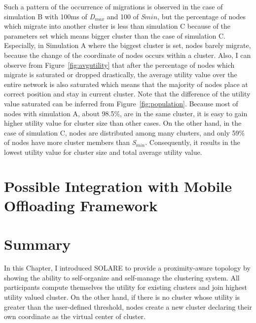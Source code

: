 %
Such a pattern of the occurrence of migrations is observed in the case
of simulation B with 100ms of \textit{D$_{max}$} and 100 of
\textit{S${min}$}, but the percentage of nodes which migrate into
another cluster is less than simulation C because of the parameters set
which means bigger cluster than the case of simulation C.
%
Especially, in Simulation A where the biggest cluster is set, nodes
barely migrate, because the change of the coordinate of nodes occurs
within a cluster.
%
Also, I can observe from Figure~\ref{fig:avgutility} that after the
percentage of nodes which migrate is saturated or dropped drastically,
the average utility value over the entire network is also saturated
which means that the majority of nodes place at correct position and
stay in current cluster.
%
Note that the difference of the utility value saturated can be inferred
from Figure~\ref{fig:population}.
%
Because most of nodes with simulation A, about 98.5\%, are in the same
cluster, it is easy to gain higher utility value for cluster size than
other cases.
%
On the other hand, in the case of simulation C, nodes are distributed
among many clusters, and only 59\% of nodes have more cluster members
than \textit{S$_{min}$}.
%
Consequently, it results in the lowest utility value for cluster size
and total average utility value.
%

\section{Possible Integration with Mobile Offloading Framework}
\label{solare:integration}


\section{Summary}
\label{solare:summary}
In this Chapter, I introduced SOLARE to provide a proximity-aware
topology by showing the ability to self-organize and self-manage the
clustering system.
%
All participants compute themselves the utility for existing clusters
and join highest utility valued cluster.
%
On the other hand, if there is no cluster whose utility is greater than
the user-defined threshold, nodes create a new cluster declaring their
own coordinate as the virtual center of cluster.





